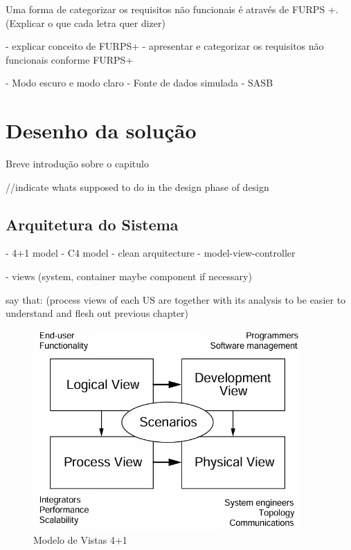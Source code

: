 Uma forma de categorizar os requisitos não funcionais  é através de FURPS +.
(Explicar o que cada letra quer dizer)

- explicar conceito de FURPS+
- apresentar e categorizar os requisitos não funcionais conforme FURPS+

- Modo escuro e modo claro
- Fonte de dados simulada
- SASB


\chapter{Desenho da solução}
Breve introdução sobre o capitulo

//indicate whats supposed to do in the design phase of design

\section{Arquitetura do Sistema} 

- 4+1 model
- C4 model
- clean arquitecture
- model-view-controller

- views (system, container maybe component if necessary)

say that:
(process views of each US are together with its analysis to be easier to understand and flesh out previous chapter)


\begin{figure}[H]
    \centering
    \includegraphics[width=4in,keepaspectratio]{frontmatter/assets/diagrams/4+1views.png}
    \caption{Modelo de Vistas 4+1}
    \label{fig:41viewmodel}
\end{figure}


